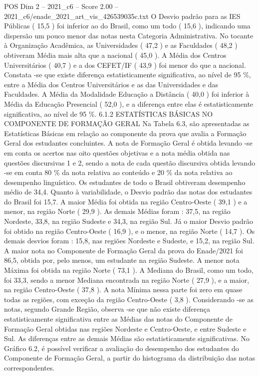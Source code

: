 \begin{textsample}{POS Dim 2 – 2021\_c6 – Score 2.00 – 2021\_c6/enade\_2021\_art\_vis\_426539035c.txt}
O Desvio padrão para as IES Públicas ( 15,5 ) foi inferior ao do Brasil, como um todo ( 15,6 ), indicando uma dispersão um pouco menor das notas nesta Categoria Administrativa.
No tocante à Organização Acadêmica, as Universidades ( 47,2 ) e as Faculdades ( 48,2 ) obtiveram Média mais alta que a nacional ( 45,0 ).
A Média dos Centros Universitários ( 40,7 ) e a dos CEFET/IF ( 43,9 ) foi menor do que a nacional.
Constata -se que existe diferença estatisticamente significativa, ao nível de 95 \%, entre a Média dos Centros Universitários e as das Universidades e das Faculdades.
A Média da Modalidade Educação a Distância ( 40,0 ) foi inferior à Média da Educação Presencial ( 52,0 ), e a diferença entre elas é estatisticamente significativa, ao nível de 95 \%. 6.1.2 ESTATÍSTICAS BÁSICAS NO COMPONENTE DE FORMAÇÃO GERAL Na Tabela 6.3, são apresentadas as Estatísticas Básicas em relação ao componente da prova que avalia a Formação Geral dos estudantes concluintes.
A nota de Formação Geral é obtida levando -se em conta os acertos nas oito questões objetivas e a nota média obtida nas questões discursivas 1 e 2, sendo a nota de cada questão discursiva obtida levando -se em conta 80 \% da nota relativa ao conteúdo e 20 \% da nota relativa ao desempenho linguístico.
Os estudantes de todo o Brasil obtiveram desempenho médio de 34,4.
Quanto à variabilidade, o Desvio padrão das notas dos estudantes do Brasil foi 15,7.
A maior Média foi obtida na região Centro-Oeste ( 39,1 ) e a menor, na região Norte ( 29,9 ).
As demais Médias foram : 37,5, na região Nordeste, 33,8, na região Sudeste e 34,3, na região Sul.
Já o maior Desvio padrão foi obtido na região Centro-Oeste ( 16,9 ), e o menor, na região Norte ( 14,7 ).
Os demais desvios foram : 15,8, nas regiões Nordeste e Sudeste, e 15,2, na região Sul.
A maior nota no Componente de Formação Geral da prova do Enade/2021 foi 86,5, obtida por, pelo menos, um estudante na região Sudeste.
A menor nota Máxima foi obtida na região Norte ( 73,1 ).
A Mediana do Brasil, como um todo, foi 33,3, sendo a menor Mediana encontrada na região Norte ( 27,9 ), e a maior, na região Centro-Oeste ( 37,8 ).
A nota Mínima nessa parte foi zero em quase todas as regiões, com exceção da região Centro-Oeste ( 3,8 ).
Considerando -se as notas, segundo Grande Região, observa -se que não existe diferença estatisticamente significativa entre as Médias das notas do Componente de Formação Geral obtidas nas regiões Nordeste e Centro-Oeste, e entre Sudeste e Sul.
As diferenças entre as demais Médias são estatisticamente significativas.
No Gráfico 6.2, é possível verificar a avaliação do desempenho dos estudantes do Componente de Formação Geral, a partir do histograma da distribuição das notas correspondentes.

\end{textsample}
